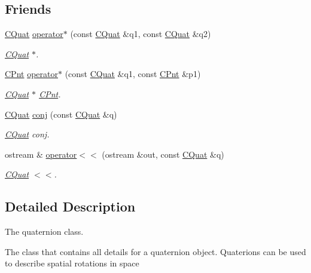 \subsection*{Friends}
\begin{DoxyCompactItemize}
\item 
\hyperlink{classCQuat}{C\-Quat} \hyperlink{classCQuat_a56293e53132060601a281240804d9302}{operator$\ast$} (const \hyperlink{classCQuat}{C\-Quat} \&q1, const \hyperlink{classCQuat}{C\-Quat} \&q2)
\begin{DoxyCompactList}\small\item\em \hyperlink{classCQuat}{C\-Quat} $\ast$. \end{DoxyCompactList}\item 
\hyperlink{classCPnt}{C\-Pnt} \hyperlink{classCQuat_ac98154ed89178004c9023423651b58a9}{operator$\ast$} (const \hyperlink{classCQuat}{C\-Quat} \&q1, const \hyperlink{classCPnt}{C\-Pnt} \&p1)
\begin{DoxyCompactList}\small\item\em \hyperlink{classCQuat}{C\-Quat} $\ast$ \hyperlink{classCPnt}{C\-Pnt}. \end{DoxyCompactList}\item 
\hyperlink{classCQuat}{C\-Quat} \hyperlink{classCQuat_a751f3ac0c157ff6967eaf2673ce1527e}{conj} (const \hyperlink{classCQuat}{C\-Quat} \&q)
\begin{DoxyCompactList}\small\item\em \hyperlink{classCQuat}{C\-Quat} conj. \end{DoxyCompactList}\item 
ostream \& \hyperlink{classCQuat_afeef42a3ba6ea600e39ee2accca10836}{operator$<$$<$} (ostream \&out, const \hyperlink{classCQuat}{C\-Quat} \&q)
\begin{DoxyCompactList}\small\item\em \hyperlink{classCQuat}{C\-Quat} $<$$<$. \end{DoxyCompactList}\end{DoxyCompactItemize}


\subsection{Detailed Description}
The quaternion class. 

The class that contains all details for a quaternion object. Quaterions can be used to describe spatial rotations in space 

